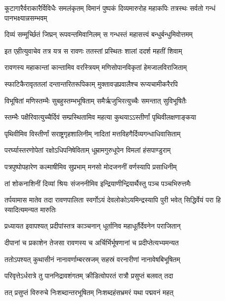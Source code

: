\threelineshloka
{कूटागारैर्वराकारैर्विविधैः समलंकृतम्}
{विमानं पुष्पकं दिव्यमारुरोह महाकपिः}
{तत्रस्थः सर्वतो गन्धं पानभक्ष्यान्नसम्भवम्} %

\twolineshloka
{दिव्यं सम्मूर्च्छितं जिघ्रन् रूपवन्तमिवानिलम्}
{स गन्धस्तं महासत्त्वं बन्धुर्बन्धुमिवोत्तमम्} %

\twolineshloka
{इत एहीत्युवाचेव तत्र यत्र स रावणः}
{ततस्तां प्रस्थितः शालां ददर्श महतीं शिवाम्} %

\twolineshloka
{रावणस्य महाकान्तां कान्तामिव वरस्त्रियम्}
{मणिसोपानविकृतां हेमजालविराजिताम्} %

\twolineshloka
{स्फाटिकैरावृततलां दन्तान्तरितरूपिकाम्}
{मुक्तावज्रप्रवालैश्च रूप्यचामीकरैरपि} %

\twolineshloka
{विभूषितां मणिस्तम्भैः सुबहुस्तम्भभूषिताम्}
{समैर्ऋजुभिरत्युच्चैः समन्तात् सुविभूषितैः} %

\twolineshloka
{स्तम्भैः पक्षैरिवात्युच्चैर्दिवं सम्प्रस्थितामिव}
{महत्या कुथयाऽऽस्तीर्णां पृथिवीलक्षणाङ्कया} %

\twolineshloka
{पृथिवीमिव विस्तीर्णां सराष्ट्रगृहशालिनीम्}
{नादितां मत्तविहगैर्दिव्यगन्धाधिवासिताम्} %

\twolineshloka
{परर्घ्यास्तरणोपेतां रक्षोऽधिपनिषेविताम्}
{धूम्रामगुरुधूपेन विमलां हंसपाण्डुराम्} %

\twolineshloka
{पत्रपुष्पोपहारेण कल्माषीमिव सुप्रभाम्}
{मनसो मोदजननीं वर्णस्यापि प्रसाधिनीम्} %

\twolineshloka
{तां शोकनाशिनीं दिव्यां श्रियः संजननीमिव}
{इन्द्रियाणीन्द्रियार्थैस्तु पञ्च पञ्चभिरुत्तमैः} %

\threelineshloka
{तर्पयामास मातेव तदा रावणपालिता}
{स्वर्गोऽयं देवलोकोऽयमिन्द्रस्यापि पुरी भवेत्}
{सिद्धिर्वेयं परा हि स्यादित्यमन्यत मारुतिः} %

\twolineshloka
{प्रध्यायत इवापश्यत् प्रदीपांस्तत्र काञ्चनान्}
{धूर्तानिव महाधूर्तैर्देवनेन पराजितान्} %

\twolineshloka
{दीपानां च प्रकाशेन तेजसा रावणस्य च}
{अर्चिर्भिर्भूषणानां च प्रदीप्तेत्यभ्यमन्यत} %

\twolineshloka
{ततोऽपश्यत् कुथासीनं नानावर्णाम्बरस्रजम्}
{सहस्रं वरनारीणां नानावेषबिभूषितम्} %

\twolineshloka
{परिवृत्तेऽर्धरात्रे तु पाननिद्रावशंगतम्}
{क्रीडित्वोपरतं रात्रौ प्रसुप्तं बलवत् तदा} %

\twolineshloka
{तत् प्रसुप्तं विरुरुचे निःशब्दान्तरभूषितम्}
{निःशब्दहंसभ्रमरं यथा पद्मवनं महत्} %

